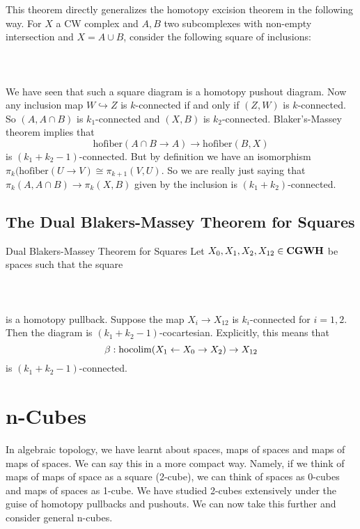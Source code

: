 \documentclass[a4paper]{article}
\begin{document}
This theorem directly generalizes the homotopy excision theorem in the following way. For $X$ a CW complex and $A,B$ two subcomplexes with non-empty intersection and $X=A\cup B$, consider the following square of inclusions: \\~\\
\\~\\
We have seen that such a square diagram is a homotopy pushout diagram. Now any inclusion map $W\hookrightarrow Z$ is $k$-connected if and only if $(Z,W)$ is $k$-connected. So $(A,A\cap B)$ is $k_1$-connected and $(X,B)$ is $k_2$-connected. Blaker's-Massey theorem implies that $$\text{hofiber}(A\cap B\to A)\to\text{hofiber}(B,X)$$ is $(k_1+k_2-1)$-connected. But by definition we have an isomorphism $\pi_k(\text{hofiber}(U\to V)\cong\pi_{k+1}(V,U)$. So we are really just saying that $\pi_k(A,A\cap B)\to\pi_k(X,B)$ given by the inclusion is $(k_1+k_2)$-connected. 

\subsection{The Dual Blakers-Massey Theorem for Squares}
\begin{thm}{Dual Blakers-Massey Theorem for Squares}{} Let $X_0,X_1,X_2,X_{12}\in\bold{CGWH}$ be spaces such that the square \\~\\
\\~\\
is a homotopy pullback. Suppose the map $X_i\to X_{12}$ is $k_i$-connected for $i=1,2$. Then the diagram is $(k_1+k_2-1)$-cocartesian. Explicitly, this means that $$\beta:\operatorname*{hocolim}(X_1\leftarrow X_0\rightarrow X_2)\to X_{12}$$ is $(k_1+k_2-1)$-connected.
\end{thm}

\pagebreak
\section{n-Cubes}
In algebraic topology, we have learnt about spaces, maps of spaces and maps of maps of spaces. We can say this in a more compact way. Namely, if we think of maps of maps of space as a square (2-cube), we can think of spaces as 0-cubes and maps of spaces as 1-cube. We have studied 2-cubes extensively under the guise of homotopy pullbacks and pushouts. We can now take this further and consider general n-cubes. 
\end{document}
